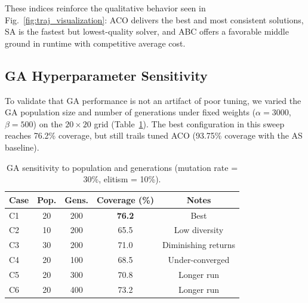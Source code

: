 \documentclass[conference]{IEEEtran}
\begin{document}
\begin{table}[t]
\centering
\caption{Performance indices over 20 independent runs on Case~1 (lower cost is better).}
\label{tab:performance_indices}
\small
{}
\end{table}

These indices reinforce the qualitative behavior seen in Fig.~\ref{fig:traj_visualization}: ACO delivers the best and most consistent solutions, SA is the fastest but lowest-quality solver, and ABC offers a favorable middle ground in runtime with competitive average cost.

\subsection{GA Hyperparameter Sensitivity}
To validate that GA performance is not an artifact of poor tuning, we varied the GA population size and number of generations under fixed weights ($\alpha=3000$, $\beta=500$) on the $20\times20$ grid (Table~\ref{tab:ga_sensitivity}). The best configuration in this sweep reaches 76.2\% coverage, but still trails tuned ACO (93.75\% coverage with the AS baseline).

\begin{table}[t]
\centering
\caption{GA sensitivity to population and generations (mutation rate = 30\%, elitism = 10\%).}
\label{tab:ga_sensitivity}
\begin{tabular}{@{}lcccc@{}}
\toprule
\textbf{Case} & \textbf{Pop.} & \textbf{Gens.} & \textbf{Coverage (\%)} & \textbf{Notes} \\
\midrule
C1 & 20 & 200 & \textbf{76.2} & Best \\
C2 & 10 & 200 & 65.5 & Low diversity \\
C3 & 30 & 200 & 71.0 & Diminishing returns \\
C4 & 20 & 100 & 68.5 & Under-converged \\
C5 & 20 & 300 & 70.8 & Longer run \\
C6 & 20 & 400 & 73.2 & Longer run \\
\bottomrule
\end{tabular}
\end{table}
\end{document}
